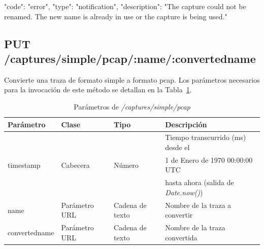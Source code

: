 \begin{itemize}
{\begin{minipage}{\textwidth}
\begin{code}[language=json]
{
  "code": "error",
  "type": "notification",
  "description": "The capture could not be renamed. The new name is already in use or the capture is being used."
}
\end{code}
\end{minipage}
}
\end{itemize}

%
%
\subsection{PUT /captures/simple/pcap/:name/:convertedname}
Convierte una \gls{traza} de formato \gls{simple} a formato \gls{pcap}.
Los parámetros necesarios para la invocación de este método se detallan en la Tabla~\ref{extra:api:capturessimplepcap:invocacion}.

\begin{table}[H]
\centering
\begin{tabular}{|l|l|l|l|}
\hline
\rowcolor[HTML]{F5F5F5}
\textbf{Parámetro}  & \textbf{Clase} & \textbf{Tipo}   & \textbf{Descripción}                        \\ \hline
                    &                &                 & Tiempo transcurrido (ms) desde el           \\
timestamp           & Cabecera       & Número          & 1 de Enero de 1970 00:00:00 UTC             \\
                    &                &                 & hasta ahora (salida de \textit{Date.now()}) \\ \hline
name                & Parámetro URL  & Cadena de texto & Nombre de la \gls{traza} a convertir        \\ \hline
convertedname       & Parámetro URL  & Cadena de texto & Nombre de la \gls{traza} convertida         \\ \hline
\end{tabular}
\caption{Parámetros de \textit{/captures/simple/pcap}}
\label{extra:api:capturessimplepcap:invocacion}
\end{table}

